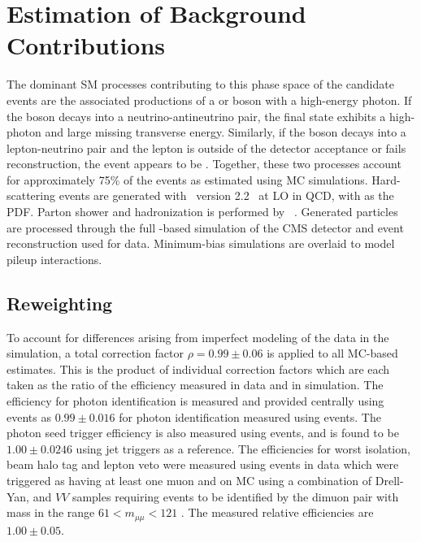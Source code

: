 \section{Estimation of Background Contributions}

The dominant SM processes contributing to this 
 phase space of the candidate events 
 are the associated productions of a \z
 or \w boson with a high-energy photon. 
If the \z boson decays into a  neutrino-antineutrino pair, 
 the final state exhibits a high-\et photon and large
 missing transverse energy. 
Similarly, if the \w boson decays into a lepton-neutrino
 pair and  the lepton is outside of the detector acceptance
 or fails reconstruction, the event appears to be \gmet.
 Together, these two processes account for approximately
  75\% of the events as
 estimated using MC simulations. 
Hard-scattering events are generated with \MGfiveAMC\
  version 2.2~\cite{Alwall:2014hca} at LO in QCD,
 with  \NNPDFthree as the PDF.
Parton shower and hadronization is performed by ~\cite{Sjostrand:2014zea}.
Generated particles are processed through the full \GEANT-based simulation of the CMS 
 detector \cite{GEANT, GEANTdev} and event reconstruction used for data. 
Minimum-bias simulations are overlaid to model pileup interactions.

 \subsection{Reweighting}\label{subsubsec:lg_reweighting}
To account for differences arising from imperfect modeling of the data in
 the simulation, a total correction factor $\rho = 0.99 \pm 0.06$ is applied to all 
 MC-based  estimates. 
This is the product of individual correction factors which 
 are each taken as the
 ratio of the efficiency measured in data and in simulation.
The efficiency for photon identification is measured
 and provided centrally using \zee events as 
 $0.99\pm0.016$ for photon identification measured using \zee events.
The photon seed trigger efficiency is also measured using \zee events,
 and is found to be $1.00\pm0.0246$ using jet triggers as a reference.
The efficiencies for 
 worst isolation, beam halo tag and lepton veto 
 were measured using events in data which were triggered as having at least
 one muon and on MC using a combination of Drell-Yan, \ttbar and $VV$ 
 samples requiring \zgmmg events to be identified by
 the dimuon pair with mass in the range $61<m_{\mu\mu}<121$ \GeV.
The measured relative efficiencies are $1.00\pm0.05$.

